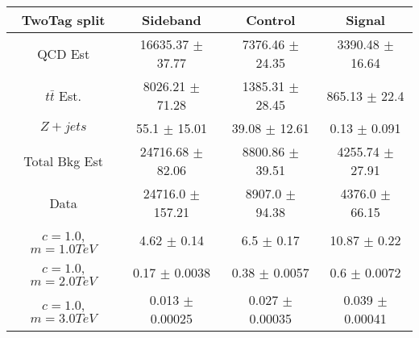 \begin{footnotesize} 
\begin{tabular}{c|c|c|c} 
TwoTag split & Sideband & Control & Signal \\ 
\hline\hline 
QCD Est & 16635.37 $\pm$ 37.77 & 7376.46 $\pm$ 24.35 & 3390.48 $\pm$ 16.64\\ 
$t\bar{t}$ Est.  & 8026.21 $\pm$ 71.28 & 1385.31 $\pm$ 28.45 & 865.13 $\pm$ 22.4\\ 
$Z+jets$ & 55.1 $\pm$ 15.01 & 39.08 $\pm$ 12.61 & 0.13 $\pm$ 0.091\\ 
Total Bkg Est & 24716.68 $\pm$ 82.06 & 8800.86 $\pm$ 39.51 & 4255.74 $\pm$ 27.91\\ 
Data & 24716.0 $\pm$ 157.21 & 8907.0 $\pm$ 94.38 & 4376.0 $\pm$ 66.15\\ 
$c=1.0$,$m=1.0TeV$ & 4.62 $\pm$ 0.14 & 6.5 $\pm$ 0.17 & 10.87 $\pm$ 0.22\\ 
$c=1.0$,$m=2.0TeV$ & 0.17 $\pm$ 0.0038 & 0.38 $\pm$ 0.0057 & 0.6 $\pm$ 0.0072\\ 
$c=1.0$,$m=3.0TeV$ & 0.013 $\pm$ 0.00025 & 0.027 $\pm$ 0.00035 & 0.039 $\pm$ 0.00041\\ 
\hline\hline 
\end{tabular} 
\end{footnotesize} 
\newline 
